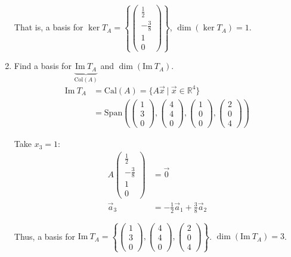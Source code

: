 \documentclass[11pt,fleqn]{book} %
\begin{document}
\begin{example}
\begin{enumerate}
        That is, a basis for $\ker T_A = \left\{ \begin{pmatrix} \frac12 \\ -\frac38 \\ 1 \\ 0 \end{pmatrix} \right\}$, $\dim\left( \ker T_A \right)=1$.

        \item Find a basis for $\underbrace{\mathrm{Im}~T_A}_{\mathrm{Col}(A)}$ and $\dim \left( \mathrm{Im}~T_A \right)$.
        \begin{align*}
            \mathrm{Im}~T_A
            &= \mathrm{Cal}(A) = \{ A\vec{x} ~|~ \vec{x} \in \mathbb{R}^4 \}
            \\
            &=\mathrm{Span}\left( \begin{pmatrix} 1\\3\\0 \end{pmatrix}, \begin{pmatrix} 4\\4\\0 \end{pmatrix}, \begin{pmatrix} 1\\0\\0 \end{pmatrix}, \begin{pmatrix} 2\\0\\4 \end{pmatrix} \right)
        \end{align*}

        Take $x_3=1$:
        \begin{align*}
            A \begin{pmatrix} \frac12\\-\frac38\\1\\0 \end{pmatrix}
            &=\vec{0}
            \\
            \vec{a}_3
            &= -\frac12\vec{a}_1 + \frac38\vec{a}_2
        \end{align*}

        Thus, a basis for $\mathrm{Im}~T_A = \left\{ \begin{pmatrix} 1\\3\\0 \end{pmatrix}, \begin{pmatrix} 4\\4\\0 \end{pmatrix}, \begin{pmatrix} 2\\0\\4 \end{pmatrix} \right\}$. $\dim\left( \mathrm{Im}~T_A \right) = 3$.


\end{enumerate}
\end{example}
\end{document}
